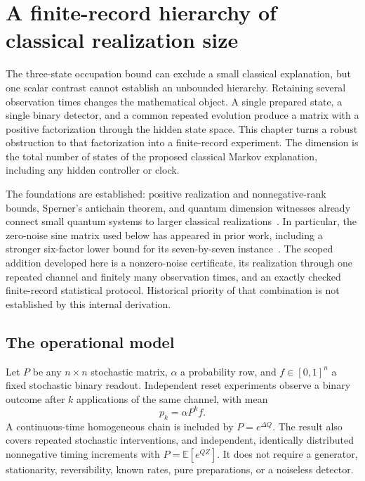 \chapter{A finite-record hierarchy of classical realization size}
\label{ch:finite-hierarchy}

The three-state occupation bound can exclude a small classical explanation,
but one scalar contrast cannot establish an unbounded hierarchy. Retaining
several observation times changes the mathematical object. A single prepared
state, a single binary detector, and a common repeated evolution produce a
matrix with a positive factorization through the hidden state space. This
chapter turns a robust obstruction to that factorization into a finite-record
experiment. The dimension is the total number of states of the proposed
classical Markov explanation, including any hidden controller or clock.

The foundations are established: positive realization and nonnegative-rank
bounds, Sperner's antichain theorem, and quantum dimension witnesses already
connect small quantum systems to larger classical realizations~\cite{rfGillis2020,rfShahandeh2024}. In particular,
the zero-noise sine matrix used below has appeared in prior work, including a
stronger six-factor lower bound for its seven-by-seven instance~\cite{rfHeinosaari2024}. The scoped
addition developed here is a nonzero-noise certificate, its realization through
one repeated channel and finitely many observation times, and an exactly checked
finite-record statistical protocol. Historical priority of that combination is
not established by this internal derivation.

\section{The operational model}
Let $P$ be any $n\times n$ stochastic matrix, $\alpha$ a probability row, and
$f\in[0,1]^n$ a fixed stochastic binary readout. Independent reset experiments
observe a binary outcome after $k$ applications of the same channel, with mean
\begin{equation}
 p_k=\alpha P^k f.                                      \label{eq:hier-pk}
\end{equation}
A continuous-time homogeneous chain is included by $P=e^{\Delta Q}$. The
result also covers repeated stochastic interventions, and independent,
identically distributed nonnegative timing increments with
$P=\mathbb E[e^{QZ}]$. It does not require a generator, stationarity, reversibility,
known rates, pure preparations, or a noiseless detector.

